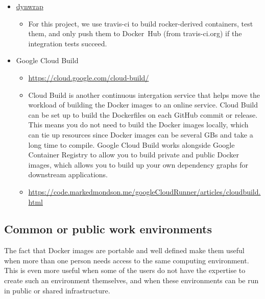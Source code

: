 \begin{itemize}
\tightlist
\item
  \href{https://github.com/dynverse/dynwrap_containers/blob/master/.travis.yml}{dynwrap}
  \citep{rcannood}

  \begin{itemize}
  \tightlist
  \item
    For this project, we use travis-ci to build rocker-derived
    containers, test them, and only push them to Docker~Hub (from
    travis-ci.org) if the integration tests succeed.
  \end{itemize}
\item
  Google Cloud Build

  \begin{itemize}
  \tightlist
  \item
    \url{https://cloud.google.com/cloud-build/}
  \item
    Cloud Build is another continuous intergation service that helps
    move the workload of building the Docker images to an online
    service. Cloud Build can be set up to build the Dockerfiles on each
    GitHub commit or release. This means you do not need to build the
    Docker images locally, which can tie up resources since Docker
    images can be several GBs and take a long time to compile. Google
    Cloud Build works alongside Google Container Registry to allow you
    to build private and public Docker images, which allows you to build
    up your own dependency graphs for downstream applications.
  \item
    \url{https://code.markedmondson.me/googleCloudRunner/articles/cloudbuild.html}
  \end{itemize}
\end{itemize}

\hypertarget{common-or-public-work-environments}{%
\subsection{Common or public work
environments}\label{common-or-public-work-environments}}

\label{workenvs}

The fact that Docker images are portable and well defined make them
useful when more than one person needs access to the same computing
environment. This is even more useful when some of the users do not have
the expertise to create such an environment themselves, and when these
environments can be run in public or shared infrastructure.

